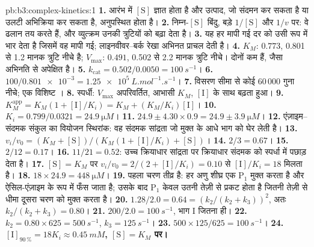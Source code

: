 \begin{solution}{pb:b3:complex-kinetics:1}
\textbf{1.} आरंभ में $[\mathrm S]$ ज्ञात होता है और उत्पाद, जो संदमन कर सकता है या उलटी अभिक्रिया
कर सकता है, अनुपस्थित होता है।
\textbf{2.} निम्न-$[\mathrm S]$ बिंदु, बड़े $1/[\mathrm S]$ और $1/v$ पर: वे ढलान तय करते हैं, और
व्युत्क्रम उनकी त्रुटियों को बढ़ा देता है।
\textbf{3.} यह हर मापी गई दर को उसी रूप में भार देता है जिसमें वह मापी गई; लाइनवीवर--बर्क रेखा
अभिनत प्राचल देती है।
\textbf{4.} $K_M$: $0.773$, 0.801 से 1.2 मानक त्रुटि नीचे है; $V_{\max}$: $0.491$, 0.502 से 2.2 मानक
त्रुटि नीचे। दोनों कम हैं, जैसा अभिनति से अपेक्षित है।
\textbf{5.} $k_{\mathrm{cat}} = 0.502/0.0050 = \qty{100}{s^{-1}}$।
\textbf{6.} $100/\num{0.801e-3} = \qty{1.25e5}{L.mol^{-1}.s^{-1}}$।
\textbf{7.} विसरण सीमा से कोई 60\,000 गुना नीचे; एक विशिष्ट ।
\textbf{8.} स्पर्धी: $V_{\max}$ अपरिवर्तित, आभासी $K_M$, $[\mathrm I]$ के साथ बढ़ता हुआ।
\textbf{9.} $K_M^{\mathrm{app}} = K_M(1 + [\mathrm I]/K_i) = K_M + (K_M/K_i)[\mathrm I]$।
\textbf{10.} $K_i = 0.799/0.0321 = \qty{24.9}{\micro M}$।
\textbf{11.} $24.9 \pm 4.30 \times 0.9 = 24.9 \pm \qty{3.9}{\micro M}$।
\textbf{12.} एंज़ाइम--संदमक संकुल का वियोजन स्थिरांक: वह
संदमक सांद्रता जो मुक्त  के आधे भाग को घेर लेती है।
\textbf{13.} $v_i/v_0 = (K_M + [\mathrm S])/(K_M(1 + [\mathrm I]/K_i) + [\mathrm S])$।
\textbf{14.} $2/3 = 0.67$।
\textbf{15.} $2/12 = 0.17$।
\textbf{16.} $11/21 = 0.52$: उच्च क्रियाधार सांद्रता पर क्रियाधार संदमक को
स्पर्धा में पछाड़ देता है।
\textbf{17.} $[\mathrm S] = K_M$ पर $v_i/v_0 = 2/(2 + [\mathrm I]/K_i) = 0.10$ से $[\mathrm I]/K_i = 18$ मिलता है।
\textbf{18.} $18 \times 24.9 = \qty{448}{\micro M}$।
\textbf{19.} पहला चरण तीव्र है: हर  अणु शीघ्र एक $\mathrm P_1$ मुक्त करता है
और ऐसिल-एंज़ाइम के रूप में फँस जाता है; उसके बाद $\mathrm P_1$ केवल उतनी तेज़ी से प्रकट होता है जितनी तेज़ी से
धीमा दूसरा चरण  को मुक्त करता है।
\textbf{20.} $1.28/2.0 = 0.64 = (k_2/(k_2 + k_3))^2$, अतः $k_2/(k_2 + k_3) = 0.80$।
\textbf{21.} $200/2.0 = \qty{100}{s^{-1}}$, भाग I जितना ही।
\textbf{22.} $k_2 = 0.80 \times 625 = \qty{500}{s^{-1}}$, $k_3 = \qty{125}{s^{-1}}$।
\textbf{23.} $500 \times 125/625 = \qty{100}{s^{-1}}$।
\textbf{24.} \textbf{$[\mathrm I]_{90\,\%} = 18K_i \approx \qty{0.45}{mM}$, $[\mathrm S] = K_M$ पर।}
\end{solution}
